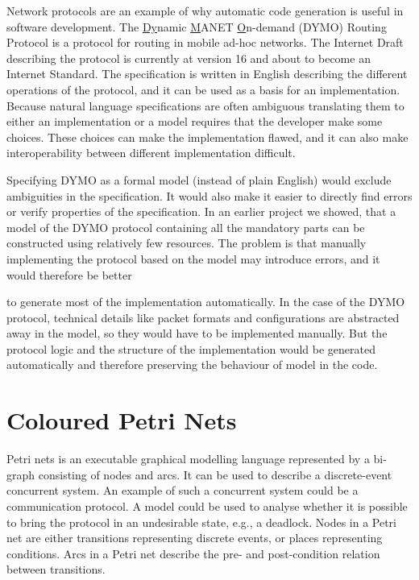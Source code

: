 Network protocols are an example of why automatic code generation is useful in software development. The \underline{Dy}namic \underline{M}ANET \underline{O}n-demand (DYMO) Routing Protocol \cite{refWorks:69} is a protocol for routing in mobile ad-hoc networks. The Internet Draft describing the protocol is currently at version 16 and about to become an Internet Standard. The specification is written in English describing the different operations of the protocol, and it can be used as a basis for an implementation. Because natural language specifications are often ambiguous translating them to either an implementation or a model requires that the developer make some choices. These choices can make the implementation flawed, and it can also make interoperability between different implementation difficult. 

Specifying DYMO as a formal model (instead of plain English) would exclude ambiguities in the specification. It would also make it easier to directly find errors or verify properties of the specification. In an earlier project \cite{RefWorks:6} we showed, that a model of the DYMO protocol containing all the mandatory parts can be constructed using relatively few resources. The problem is that manually implementing the protocol based on the model may introduce errors, and it would therefore be better  to generate most of the implementation automatically. In the case of the DYMO protocol, technical details like packet formats and configurations are abstracted away in the model, so they would have to be implemented manually. But the protocol logic and the structure of the implementation would be generated automatically and therefore preserving the behaviour of model in the code.


\section{Coloured Petri Nets}

Petri nets \cite{Petri} is an executable graphical modelling language represented by a bi-graph consisting of nodes and arcs. It can be used to describe a discrete-event concurrent system. An example of such a concurrent system could be a communication protocol. A model could be used to analyse whether it is possible to bring the protocol in an undesirable state, e.g., a deadlock. Nodes in a Petri net are either transitions representing discrete events, or places representing conditions. Arcs in a Petri net describe the pre- and post-condition relation between transitions. 

